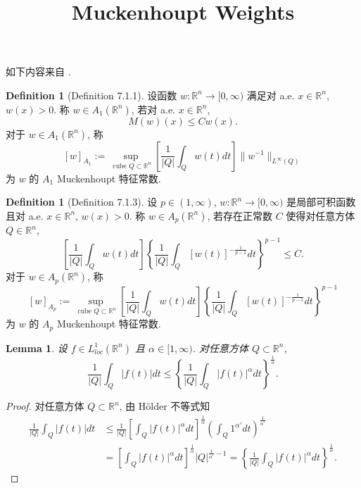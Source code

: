 \documentclass[a4paper,11pt]{article}
\title{Muckenhoupt Weights}
\newtheorem{lemma}[theorem]{Lemma}
\theoremstyle{definition}
\newtheorem{definition}[theorem]{Definition}
\begin{document}
\begin{CJK*}{UTF8}{gbsn}

\maketitle

如下内容来自 \cite{g14}.

\begin{definition}[Definition 7.1.1]
    设函数 $ w: \mathbb{R}^n \to [0, \infty) $ 满足对 a.e. $ x \in \mathbb{R}^n $, $ w(x) > 0 $.
    称 $ w \in A_1(\mathbb{R}^n) $, 若对 a.e. $ x \in \mathbb{R}^n $,
    $$
        M(w)(x) \leq C w(x).
    $$
    对于 $ w \in A_1(\mathbb{R}^n) $, 称
    $$
        [w]_{A_1} := \sup_{\text{ cube } Q \subset \mathbb{R}^n} 
            \left[ \frac{1}{|Q|} \int_Q w(t) dt \right] \| w^{-1} \|_{L^\infty (Q)}
    $$
    为 $ w $ 的 $ A_1 $ Muckenhoupt 特征常数.
\end{definition}

\begin{definition}[Definition 7.1.3]
    设 $ p \in (1, \infty) $, $ w: \mathbb{R}^n \to [0, \infty) $ 是局部可积函数 
    且对 a.e. $ x \in \mathbb{R}^n $, $ w(x) > 0 $.
    称 $ w \in A_p(\mathbb{R}^n) $, 若存在正常数 $ C $ 使得对任意方体 $ Q \in \mathbb{R}^n $,
    $$
        \left[ \frac{1}{|Q|} \int_Q w(t) dt \right] 
            \left\{ \frac{1}{|Q|} \int_Q [w(t)]^{-\frac{1}{p-1}}dt \right\}^{p-1} \leq C.
    $$
    对于 $ w \in A_p(\mathbb{R}^n) $, 称
    $$
        [w]_{A_p} := \sup_{\text{ cube } Q \subset \mathbb{R}^n} 
            \left[ \frac{1}{|Q|} \int_Q w(t) dt \right] 
            \left\{ \frac{1}{|Q|} \int_Q [w(t)]^{-\frac{1}{p-1}}dt \right\}^{p-1}
    $$
    为 $ w $ 的 $ A_p $ Muckenhoupt 特征常数.
\end{definition}

\begin{lemma} \label{lemma}
    设 $ f \in L^1_{loc}(\mathbb{R}^n) $ 且 $ \alpha \in [1, \infty) $.
    对任意方体 $ Q \subset \mathbb{R}^n $,
    $$
        \frac{1}{|Q|} \int_Q |f(t)| dt 
            \leq \left\{ \frac{1}{|Q|} \int_Q |f(t)|^\alpha dt \right\}^{\frac{1}{\alpha}}.
    $$
\end{lemma}

\begin{proof}
    对任意方体 $ Q \subset \mathbb{R}^n $, 由 H\"older 不等式知
    \begin{align*}
        \frac{1}{|Q|} \int_Q |f(t)| dt 
            &\leq \frac{1}{|Q|} \left[ \int_Q |f(t)|^\alpha dt \right]^{\frac{1}{\alpha}}
                \left( \int_Q 1^{\alpha'} dt \right)^{\frac{1}{\alpha'}}  \\
            &= \left[ \int_Q |f(t)|^\alpha dt \right]^{\frac{1}{\alpha}} |Q|^{\frac{1}{\alpha'} - 1} 
            = \left\{ \frac{1}{|Q|} \int_Q |f(t)|^\alpha dt \right\}^{\frac{1}{\alpha}}.
    \end{align*}
\end{proof}


\end{CJK*}
\end{document}
